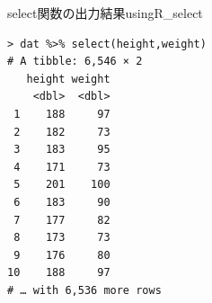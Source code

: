 \begin{Rscreen}{select関数の出力結果}{usingR_select}
	\begin{verbatim}
> dat %>% select(height,weight)
# A tibble: 6,546 × 2
   height weight
    <dbl>  <dbl>
 1    188     97
 2    182     73
 3    183     95
 4    171     73
 5    201    100
 6    183     90
 7    177     82
 8    173     73
 9    176     80
10    188     97
# … with 6,536 more rows
\end{verbatim}
\end{Rscreen}
